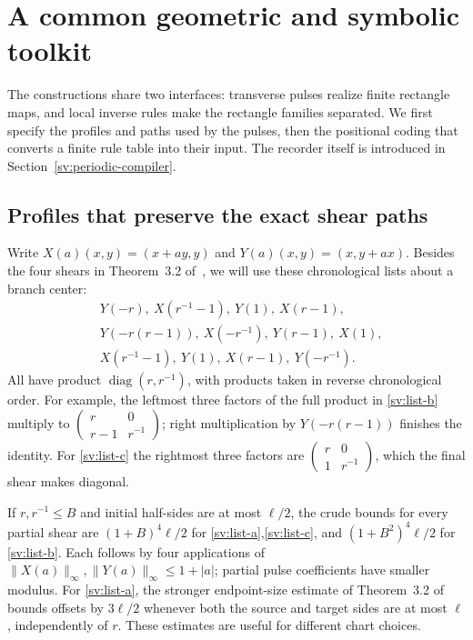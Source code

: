 \section{A common geometric and symbolic toolkit}
\label{sv:toolkit}

The constructions share two interfaces: transverse pulses realize finite
rectangle maps, and local inverse rules make the rectangle families
separated. We first specify the profiles and paths used by the pulses,
then the positional coding that converts a finite rule table into their
input. The recorder itself is introduced in Section~\ref{sv:periodic-compiler}.

\subsection{Profiles that preserve the exact shear paths}
\label{sv:profiles}
Write $X(a)(x,y)=(x+ay,y)$ and $Y(a)(x,y)=(x,y+ax)$.
Besides the four shears in Theorem~3.2 of~\cite{Entry}, we will use
these chronological lists about a branch center:
\begin{align}
 &Y(-r),\ X(r^{-1}-1),\ Y(1),\ X(r-1),\label{sv:list-a}\\
 &Y(-r(r-1)),\ X(-r^{-1}),\ Y(r-1),\ X(1),\label{sv:list-b}\\
 &X(r^{-1}-1),\ Y(1),\ X(r-1),\ Y(-r^{-1}).\label{sv:list-c}
\end{align}
All have product $\operatorname{diag}(r,r^{-1})$, with products
taken in reverse chronological order.  For example, the leftmost three
factors of the full product in \eqref{sv:list-b} multiply to
$\left(\begin{smallmatrix}r&0\\r-1&r^{-1}\end{smallmatrix}\right)$;
right multiplication by $Y(-r(r-1))$ finishes the identity.
For \eqref{sv:list-c} the rightmost three factors are
$\left(\begin{smallmatrix}r&0\\1&r^{-1}\end{smallmatrix}\right)$,
which the final shear makes diagonal.

If $r,r^{-1}\le B$ and initial half-sides are at most $\ell/2$,
the crude bounds for every partial shear are
$(1+B)^4\ell/2$ for \eqref{sv:list-a},\eqref{sv:list-c}, and
$(1+B^2)^4\ell/2$ for \eqref{sv:list-b}.  Each follows by four
applications of $\|X(a)\|_\infty,\|Y(a)\|_\infty\le1+|a|$;
partial pulse coefficients have smaller modulus.  For
\eqref{sv:list-a}, the stronger endpoint-size estimate of
Theorem~3.2 of~\cite{Entry} bounds offsets by $3\ell/2$ whenever
both the source and target sides are at most $\ell$, independently
of $r$.  These estimates are useful for different chart choices.

